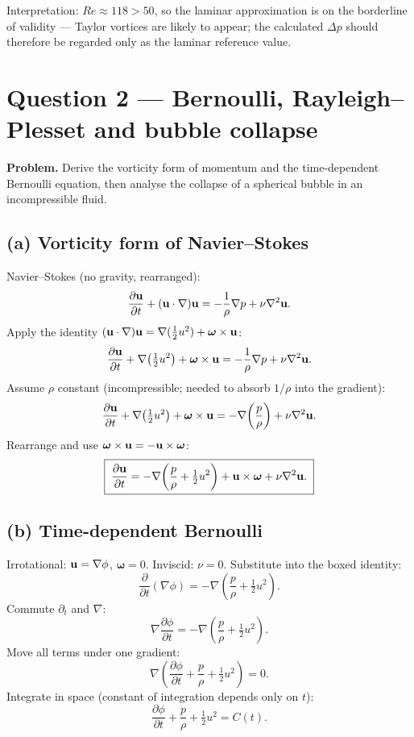 \documentclass[11pt]{article}
\newcommand{\pd}[2]{\frac{\partial #1}{\partial #2}}
\newcommand{\Lap}{\nabla^{2}}
\begin{document}
Interpretation: $Re\approx 118>50$, so the laminar approximation is on the borderline of validity --- Taylor vortices are likely to appear; the calculated $\Delta p$ should therefore be regarded only as the laminar reference value.

\section*{Question 2 --- Bernoulli, Rayleigh--Plesset and bubble collapse}

\textbf{Problem.} Derive the vorticity form of momentum and the time-dependent Bernoulli equation, then analyse the collapse of a spherical bubble in an incompressible fluid.

\subsection*{(a) Vorticity form of Navier--Stokes}

Navier--Stokes (no gravity, rearranged):
\[ \pd{\vb u}{t} + (\vb u\cdot\nabla)\vb u = -\frac{1}{\rho}\nabla p + \nu\Lap\vb u. \]
Apply the identity $(\vb u\cdot\nabla)\vb u = \nabla(\tfrac12 u^2) + \bm\omega\times\vb u$:
\[ \pd{\vb u}{t} + \nabla\!\left(\tfrac12 u^2\right) + \bm\omega\times\vb u = -\frac{1}{\rho}\nabla p + \nu\Lap\vb u. \]
Assume $\rho$ constant (incompressible; needed to absorb $1/\rho$ into the gradient):
\[ \pd{\vb u}{t} + \nabla\!\left(\tfrac12 u^2\right) + \bm\omega\times\vb u = -\nabla\!\left(\frac{p}{\rho}\right) + \nu\Lap\vb u. \]
Rearrange and use $\bm\omega\times\vb u = -\vb u\times\bm\omega$:
\[ \boxed{\;\pd{\vb u}{t} = -\nabla\!\left(\frac{p}{\rho} + \tfrac12 u^2\right) + \vb u\times\bm\omega + \nu\Lap\vb u.\;} \]

\subsection*{(b) Time-dependent Bernoulli}

Irrotational: $\vb u = \nabla\phi$, $\bm\omega = 0$. Inviscid: $\nu=0$. Substitute into the boxed identity:
\[ \pd{}{t}(\nabla\phi) = -\nabla\!\left(\frac{p}{\rho} + \tfrac12 u^2\right). \]
Commute $\partial_t$ and $\nabla$:
\[ \nabla\pd{\phi}{t} = -\nabla\!\left(\frac{p}{\rho} + \tfrac12 u^2\right). \]
Move all terms under one gradient:
\[ \nabla\!\left(\pd{\phi}{t} + \frac{p}{\rho} + \tfrac12 u^2\right) = 0. \]
Integrate in space (constant of integration depends only on $t$):
\[ \boxed{\;\pd{\phi}{t} + \frac{p}{\rho} + \tfrac12 u^2 = C(t).\;} \]
\end{document}
